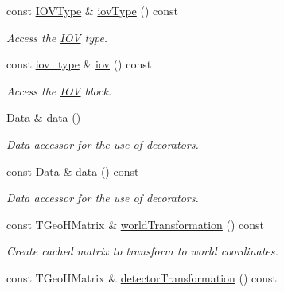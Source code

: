 \begin{DoxyCompactItemize}
const \hyperlink{class_d_d4hep_1_1_i_o_v_type}{IOVType} \& \hyperlink{class_d_d4hep_1_1_alignments_1_1_alignment_condition_a499330052ed8d30261c66bcd91984c17}{iovType} () const 
\begin{DoxyCompactList}\small\item\em Access the \hyperlink{class_d_d4hep_1_1_i_o_v}{IOV} type. \item\end{DoxyCompactList}\item 
const \hyperlink{class_d_d4hep_1_1_i_o_v}{iov\_\-type} \& \hyperlink{class_d_d4hep_1_1_alignments_1_1_alignment_condition_afdf431da7cfd5de1c2335376b8efe93f}{iov} () const 
\begin{DoxyCompactList}\small\item\em Access the \hyperlink{class_d_d4hep_1_1_i_o_v}{IOV} block. \item\end{DoxyCompactList}\item 
\hyperlink{class_d_d4hep_1_1_alignments_1_1_alignment_data}{Data} \& \hyperlink{class_d_d4hep_1_1_alignments_1_1_alignment_condition_a29cd43941dc85481f8b63ee037041006}{data} ()
\begin{DoxyCompactList}\small\item\em Data accessor for the use of decorators. \item\end{DoxyCompactList}\item 
const \hyperlink{class_d_d4hep_1_1_alignments_1_1_alignment_data}{Data} \& \hyperlink{class_d_d4hep_1_1_alignments_1_1_alignment_condition_a3425870f9b961eef0be9c68cb3117614}{data} () const 
\begin{DoxyCompactList}\small\item\em Data accessor for the use of decorators. \item\end{DoxyCompactList}\item 
const TGeoHMatrix \& \hyperlink{class_d_d4hep_1_1_alignments_1_1_alignment_condition_a4e254e214e4b3b6d60b0db9268d63b3b}{worldTransformation} () const 
\begin{DoxyCompactList}\small\item\em Create cached matrix to transform to world coordinates. \item\end{DoxyCompactList}\item 
const TGeoHMatrix \& \hyperlink{class_d_d4hep_1_1_alignments_1_1_alignment_condition_ad0c399c6f6a8aefe831e1e373d4e01ef}{detectorTransformation} () const 

\end{DoxyCompactItemize}
